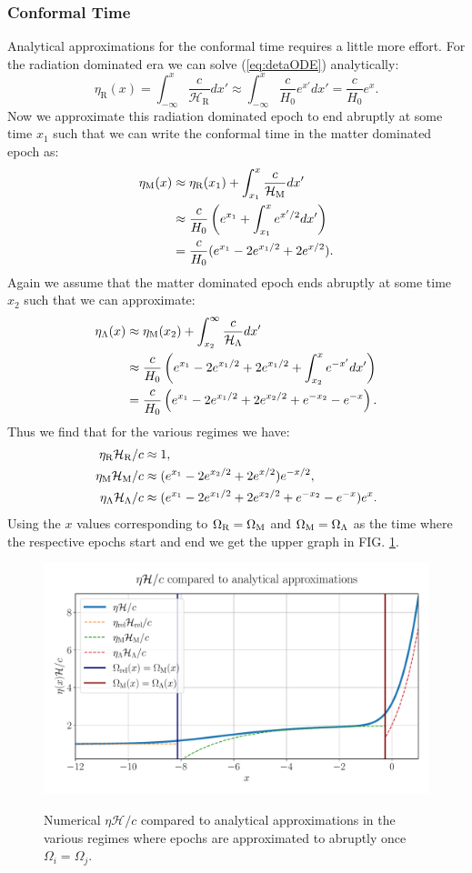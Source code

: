 \documentclass[%
reprint,
 amsmath,amssymb,
 aps,
]{revtex4-2}
\newcommand{\Hp}{\mathcal{H}}
\begin{document}
\subsubsection{Conformal Time}
Analytical approximations for the conformal time requires a little more effort. For the radiation dominated era we can solve (\ref{eq:detaODE}) analytically:
\[\eta_\text{R}(x)=\int_{-\infty}^x\frac{c}{\Hp_\text{R}}dx'\approx\int_{-\infty}^x\frac{c}{H_0}e^{x'}dx'=\frac{c}{H_0}e^x.\]
Now we approximate this radiation dominated epoch to end abruptly at some time $x_1$ such that we can write the conformal time in the matter dominated epoch as:
\begin{align*}
	\eta_\text M(x)&\approx\eta_\text{R}(x_1)+\int_{x_1}^x\frac{c}{\Hp_\text M}dx'\\
	&\approx\frac{c}{H_0}\left(e^{x_1}+\int_{x_1}^xe^{x'/2}dx' \right)\\
	&=\frac{c}{H_0}(e^{x_1}-2e^{x_1/2}+2e^{x/2}).
\end{align*}
Again we assume that the matter dominated epoch ends abruptly at some time $x_2$ such that we can approximate:
\begin{align*}
	\eta_\Lambda(x)&\approx\eta_\text M(x_2)+\int_{x_2}^\infty\frac{c}{\Hp_\Lambda}dx'\\
	&\approx\frac{c}{H_0}\left(e^{x_1}-2e^{x_1/2}+2e^{x_1/2}+\int_{x_2}^x e^{-x'}dx' \right)\\
	&=\frac{c}{H_0}\left(e^{x_1}-2e^{x_1/2}+2e^{x_2/2}+e^{-x_2}-e^{-x} \right).
\end{align*}
Thus we find that for the various regimes we have:
\begin{align*}
	\eta_\text{R}\Hp_\text{R}/c&\approx1,\\
	\eta_\text M\Hp_\text M/c&\approx(e^{x_1}-2e^{x_2/2}+2e^{x/2})e^{-x/2},\\
	\eta_\Lambda\Hp_\Lambda/c&\approx(e^{x_1}-2e^{x_1/2}+2e^{x_2/2}+e^{-x_2}-e^{-x})e^{x}.
\end{align*}
Using the $x$ values corresponding to $\Omega_{\text{R}}=\Omega_\text M$ and $\Omega_{\text M}=\Omega_\Lambda$ as the time where the respective epochs start and end we get the upper graph in FIG. \ref{fig:eta_vs_anal_merge}.
\begin{figure}[ht!]
	\caption{Numerical $\eta\Hp/c$ compared to analytical approximations in the various regimes where epochs are approximated to abruptly once $\Omega_i=\Omega_j$.}
	\includegraphics[width = \linewidth]{Figures/Eta_vs_anal_merge.pdf}
	\label{fig:eta_vs_anal_merge}
\end{figure}
\end{document}
